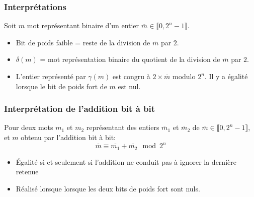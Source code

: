 \begin{frame}
  \frametitle{Interprétations}
Soit $m$ mot représentant binaire d'un entier $\overline{m}\in \llbracket 0, 2^{n}-1 \rrbracket$.
\begin{itemize}
  \item Bit de poids faible = reste de la division de $\overline{m}$ par $2$.
  \item $\delta(m)$ = mot représentation binaire du quotient de la division de $\overline{m}$ par $2$.
  \item L'entier représenté par $\gamma(m)$ est congru à $2\times\overline{m}$ modulo $2^{n}$. Il y a égalité lorsque le bit de poids fort de $m$ est nul.
\end{itemize}
\end{frame}

\begin{frame}
  \frametitle{Interprétation de l'addition bit à bit}
Pour deux mots $m_1$ et $m_2$ représentant des entiers $\overline{m}_1$ et $\overline{m}_2$ de $\overline{m}\in \llbracket 0, 2^{n}-1 \rrbracket$, et $m$ obtenu par l'addition bit à bit:
\begin{displaymath}
  \overline{m} \equiv \overline{m_1} + \overline{m_2} \mod 2^{n}
\end{displaymath}
\begin{itemize}
  \item \'Egalité si et seulement si l'addition ne conduit pas à ignorer la dernière retenue 
  \item Réalisé lorsque lorsque les deux bits de poids fort sont nuls.
\end{itemize}
\end{frame}

